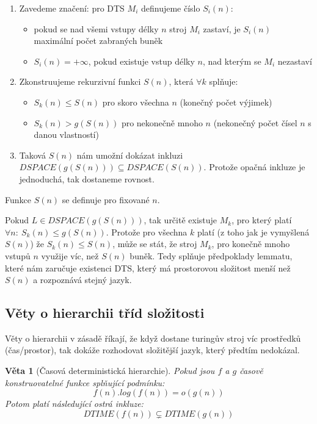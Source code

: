 \documentclass[a4paper]{article}      %
\newtheorem{theorem}{Věta}[section]
\newenvironment{proof}[1][Důkaz]{\begin{trivlist}
\item[\hskip \labelsep {\bfseries #1}]}{\end{trivlist}}
\begin{document}
\begin{proof}
\begin{enumerate}
	\item Zavedeme značení: pro DTS $M_{i}$ definujeme číslo $S_{i}(n)$:
	\begin{itemize}
		\item pokud se nad všemi vstupy délky $n$ stroj $M_{i}$ zastaví, je $S_{i}(n)$ maximální počet zabraných buněk
		\item $S_{i}(n) = +\infty$, pokud existuje vstup délky $n$, nad kterým se $M_{i}$ nezastaví
	\end{itemize}
\item Zkonstruujeme rekurzivní funkci $S(n)$, která $\forall k$ splňuje:
	\begin{itemize}
		\item $S_{k}(n) \leq S(n)$ pro skoro všechna $n$ (konečný počet výjimek)
		\item $S_{k}(n) > g(S(n))$ pro nekonečně mnoho $n$ (nekonečný počet čísel $n$ s danou vlastností)
	\end{itemize}
\item Taková $S(n)$ nám umožní dokázat inkluzi $DSPACE(g(S(n))) \subseteq DSPACE(S(n))$.
Protože opačná inkluze je jednoduchá, tak dostaneme rovnost.
\end{enumerate}

Funkce $S(n)$ se definuje pro fixované $n$.

Pokud $L \in DSPACE(g(S(n)))$, tak určitě existuje $M_k$, pro který platí $\forall n:\ S_{k}(n) \leq g(S(n))$.
Protože pro všechna $k$ platí (z toho jak je vymyšlená $S(n)$) že $S_{k}(n) \leq S(n)$, může se stát, že stroj $M_{k}$, pro konečně mnoho vstupů $n$ využije víc, než $S(n)$ buněk. Tedy splňuje předpoklady lemmatu, které nám zaručuje existenci DTS, který má prostorovou složitost menší než $S(n)$ a rozpoznává stejný jazyk.
\end{proof}

\subsection{Věty o hierarchii tříd složitosti}
Věty o hierarchii v zásadě říkají, že když dostane turingův stroj víc prostředků (čas/prostor), tak dokáže rozhodovat
složitější jazyk, který předtím nedokázal.

\begin{theorem}[Časová deterministická hierarchie]
Pokud jsou $f$ a $g$ časově konstruovatelné funkce splňující podmínku:
\[
f(n).log(f(n)) = o(g(n))
\]
Potom platí následující ostrá inkluze:
\[
DTIME(f(n)) \subsetneq DTIME(g(n))
\]
\end{theorem}
\end{document}
